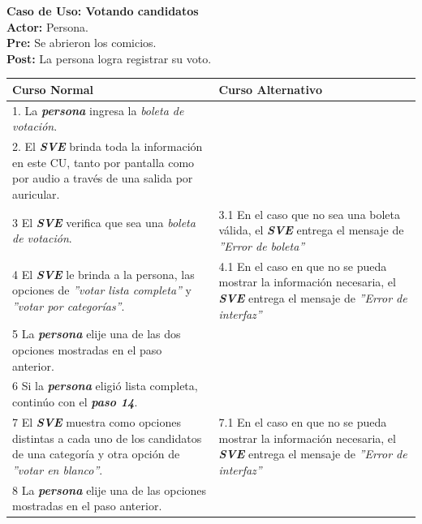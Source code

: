 \documentclass[spanish, 10pt,a4paper]{article}
\numberwithin{equation}{section} %
\begin{document}
\noindent\textbf{Caso de Uso: Votando candidatos}\\
\textbf{Actor: } Persona.\\
\textbf{Pre: } Se abrieron los comicios.\\
\textbf{Post: } La persona logra registrar su voto.\\
\begin{table}[H]
  \centering
\bgroup
\def\arraystretch{1.3}
  \begin{tabular}{p{9cm} | p{7cm}}
    \hline
    Curso Normal & Curso Alternativo \\
    \hline
    \hline    
    1. La \textbf{\textit{persona}} ingresa la \textit{boleta de votación}. 
    & \\
    
    \hline
    2. El \textbf{\textit{SVE}} brinda toda la información en este CU, tanto por pantalla como por audio a través de una salida por auricular.
    &
    \\
    
    \hline
    3 El \textbf{\textit{SVE}} verifica que sea una \textit{boleta de votación}.
    & 
    3.1 En el caso que no sea una boleta válida, el \textbf{\textit{SVE}} entrega el mensaje de \textit{''Error de boleta''}
    \\
    
    \hline
    4 El \textbf{\textit{SVE}} le brinda a la persona, las opciones de \textit{''votar lista completa''} y \textit{''votar por categorías''}.
    & 
    4.1 En el caso en que no se pueda mostrar la información necesaria, el \textbf{\textit{SVE}} entrega el mensaje de \textit{''Error de interfaz''}
    \\
    
    \hline
    5 La \textbf{\textit{persona}} elije una de las dos opciones mostradas en el paso anterior.
    & \\
    
    \hline
    6 Si la \textbf{\textit{persona}} eligió lista completa, continúo con el \textbf{\textit{paso 14}}.
    & \\
    
    \hline
    7 El \textbf{\textit{SVE}} muestra como opciones distintas a cada uno de los candidatos de una categoría y otra opción de \textit{''votar en blanco''}.
    & 
    7.1 En el caso en que no se pueda mostrar la información necesaria, el \textbf{\textit{SVE}} entrega el mensaje de \textit{''Error de interfaz''}
    \\
    
    \hline
    8 La \textbf{\textit{persona}} elije una de las opciones mostradas en el paso anterior.
    & \\
    

\end{tabular}
\end{table}
\end{document}
